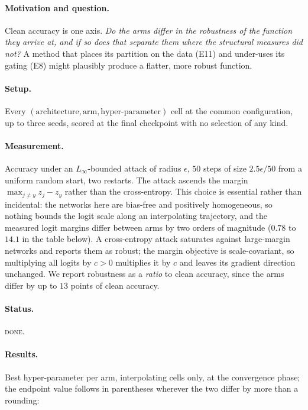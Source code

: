 \documentclass{article} %
\theoremstyle{plain}
\theoremstyle{definition}
\theoremstyle{remark}
\begin{document}
\paragraph{Motivation and question.}
Clean accuracy is one axis. \emph{Do the arms differ in the robustness of the function they arrive
at, and if so does that separate them where the structural measures did not?} A method that places
its partition on the data (E11) and under-uses its gating (E8) might plausibly produce a flatter,
more robust function.

\paragraph{Setup.}
Every $(\text{architecture}, \text{arm}, \text{hyper-parameter})$ cell at the common configuration,
up to three seeds, scored at the final checkpoint with no selection of any kind.

\paragraph{Measurement.}
Accuracy under an $L_\infty$-bounded attack of radius $\epsilon$, $50$ steps of size
$2.5\epsilon/50$ from a uniform random start, two restarts. The attack ascends the margin
$\max_{j \ne y} z_j - z_y$ rather than the cross-entropy. This choice is essential rather than
incidental: the networks here are bias-free and positively homogeneous, so nothing bounds the logit
scale along an interpolating trajectory, and the measured logit margins differ between arms by two
orders of magnitude ($0.78$ to $14.1$ in the table below). A cross-entropy attack saturates against
large-margin networks and reports them as robust; the margin objective is scale-covariant, so
multiplying all logits by $c > 0$ multiplies it by $c$ and leaves its gradient direction unchanged.
We report robustness as a \emph{ratio} to clean accuracy, since the arms differ by up to $13$ points
of clean accuracy.

\paragraph{Status.} \textsc{done}.

\paragraph{Results.} Best hyper-parameter per arm, interpolating cells only, at the convergence
phase; the endpoint value follows in parentheses wherever the two differ by more than a rounding:
\end{document}
